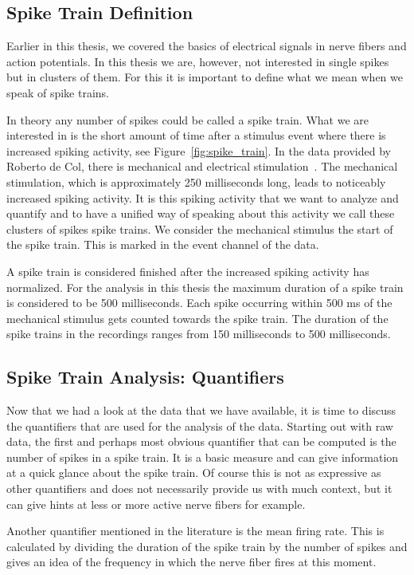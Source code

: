 \subsection{Spike Train Definition}
Earlier in this thesis, we covered the basics of electrical signals in nerve fibers and action potentials. In this thesis we are, however, not interested in single spikes but in clusters of them. For this it is important to define what we mean when we speak of spike trains.

In theory any number of spikes could be called a spike train. What we are interested in is the short amount of time after a stimulus event where there is increased spiking activity, see Figure~\ref{fig:spike_train}. In the data provided by Roberto de Col, there is mechanical and electrical stimulation~\cite{roberto}. The mechanical stimulation, which is approximately 250 milliseconds long, leads to noticeably increased spiking activity. It is this spiking activity that we want to analyze and quantify and to have a unified way of speaking about this activity we call these clusters of spikes spike trains. We consider the mechanical stimulus the start of the spike train. This is marked in the event channel of the data. 

A spike train is considered finished after the increased spiking activity has normalized. For the analysis in this thesis the maximum duration of a spike train is considered to be 500 milliseconds. Each spike occurring within 500 ms of the mechanical stimulus gets counted towards the spike train. The duration of the spike trains in the recordings ranges from 150 milliseconds to 500 milliseconds.

\subsection{Spike Train Analysis: Quantifiers}
Now that we had a look at the data that we have available, it is time to discuss the quantifiers that are used for the analysis of the data.
Starting out with raw data, the first and perhaps most obvious quantifier that can be computed is the number of spikes in a spike train. It is a basic measure and can give information at a quick glance about the spike train. Of course this is not as expressive as other quantifiers and does not necessarily provide us with much context, but it can give hints at less or more active nerve fibers for example. 

Another quantifier mentioned in the literature is the mean firing rate. This is calculated by dividing the duration of the spike train by the number of spikes and gives an idea of the frequency in which the nerve fiber fires at this moment.

